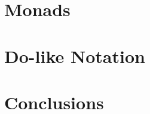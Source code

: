\documentclass[12pt,fleqn]{article}
\begin{document}
\section*{Monads}
 
\section*{Do-like Notation}
 


\section*{Conclusions}
\end{document}
